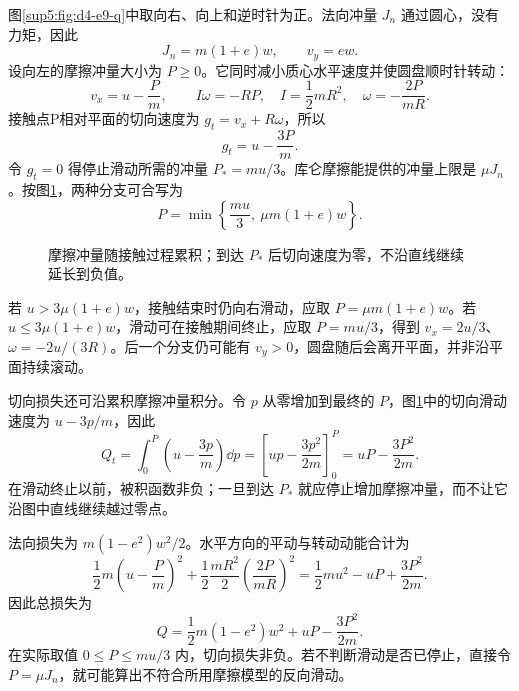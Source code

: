 \begin{solution}
图\ref{sup5:fig:d4-e9-q}中取向右、向上和逆时针为正。法向冲量 $J_n$ 通过圆心，没有力矩，因此
\begin{equation}
 J_n=m(1+e)w,\qquad v_y=ew.
\end{equation}
设向左的摩擦冲量大小为 $P\ge0$。它同时减小质心水平速度并使圆盘顺时针转动：
\begin{equation}
 v_x=u-\frac Pm,\qquad
 I\omega=-RP,\quad I=\frac12mR^2,\quad
 \omega=-\frac{2P}{mR}.
\end{equation}
接触点P相对平面的切向速度为 $g_t=v_x+R\omega$，所以
\begin{equation}
 g_t=u-\frac{3P}{m}.
\end{equation}
令 $g_t=0$ 得停止滑动所需的冲量 $P_*=mu/3$。库仑摩擦能提供的冲量上限是 $\mu J_n$。按图\ref{sup5:fig:d4-e9-s}，两种分支可合写为
\begin{equation}\label{sup5:eq:d4-friction}
 P=\min\left\{\frac{mu}{3},\ \mu m(1+e)w\right\}.
\end{equation}
\begin{figure}[H]\centering
{}
\caption{摩擦冲量随接触过程累积；到达 $P_*$ 后切向速度为零，不沿直线继续延长到负值。}\label{sup5:fig:d4-e9-s}
\end{figure}
若 $u>3\mu(1+e)w$，接触结束时仍向右滑动，应取 $P=\mu m(1+e)w$。若 $u\le3\mu(1+e)w$，滑动可在接触期间终止，应取 $P=mu/3$，得到 $v_x=2u/3$、$\omega=-2u/(3R)$。后一个分支仍可能有 $v_y>0$，圆盘随后会离开平面，并非沿平面持续滚动。

切向损失还可沿累积摩擦冲量积分。令 $p$ 从零增加到最终的 $P$，图\ref{sup5:fig:d4-e9-s}中的切向滑动速度为 $u-3p/m$，因此
\[
Q_t=\int_0^P\left(u-\frac{3p}{m}\right)\dd p
=\left[up-\frac{3p^2}{2m}\right]_0^P
=uP-\frac{3P^2}{2m}.
\]
在滑动终止以前，被积函数非负；一旦到达 $P_*$ 就应停止增加摩擦冲量，而不让它沿图中直线继续越过零点。

法向损失为 $m(1-e^2)w^2/2$。水平方向的平动与转动动能合计为
\begin{equation}
 \frac12m\left(u-\frac Pm\right)^2
 +\frac12\frac{mR^2}{2}\left(\frac{2P}{mR}\right)^2
 =\frac12mu^2-uP+\frac{3P^2}{2m}.
\end{equation}
因此总损失为
\begin{equation}
 Q=\frac12m(1-e^2)w^2+uP-\frac{3P^2}{2m}.
\end{equation}
在实际取值 $0\le P\le mu/3$ 内，切向损失非负。若不判断滑动是否已停止，直接令 $P=\mu J_n$，就可能算出不符合所用摩擦模型的反向滑动。
\end{solution}



